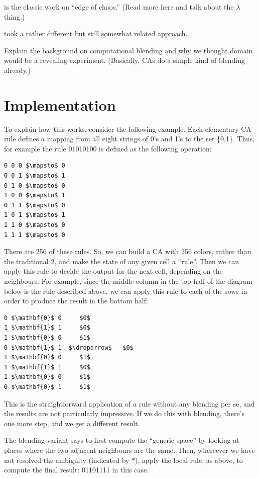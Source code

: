\documentclass{AISB2008}
\newcommand{\droparrow}{%
  \mathchoice{\raisebox{-4pt}{$\displaystyle\mapsto$}}
             {\raisebox{-4pt}{$\mapsto$}}
             {\raisebox{-2pt}{$\scriptstyle\mapsto$}}
             {\raisebox{-2pt}{$\scriptscriptstyle\mapsto$}}}
\begin{document}
\cite{mitchell1993revisiting} is the classic work on ``edge of
chaos.'' (Read more here and talk about the $\lambda$ thing.)

\cite{hofstadter1995prolegomena,marshall1999metacat} took a rather
different but still somewhat related approach.

Explain the background on computational blending and why we thought
domain would be a revealing experiment.  (Basically, CAs do a simple
kind of blending already.)

\clearpage

\section{Implementation}

To explain how this works, consider the following example.  Each elementary CA rule defines a mapping from all eight strings of 0's and 1's to the set \{0,1\}.  Thus, for example the rule 01010100 is defined as the following operation:
\begin{lstlisting}[mathescape]
0 0 0 $\mapsto$ 0
0 0 1 $\mapsto$ 1
0 1 0 $\mapsto$ 0
1 0 0 $\mapsto$ 1
0 1 1 $\mapsto$ 0
1 0 1 $\mapsto$ 1
1 1 0 $\mapsto$ 0
1 1 1 $\mapsto$ 0
\end{lstlisting}

There are 256 of these rules. So, we can build a CA with 256 colors, rather than the traditional 2, and make the state of any given cell a ``rule''. Then we can apply this rule to decide the output for the next cell, depending on the neighbours. For example, since the middle column in the top half of the diagram below is the rule described above, we can apply this rule to each of the rows in order to produce the result in the bottom half:
\begin{lstlisting}[mathescape]
0 $\mathbf{0}$ 0     $0$ 
1 $\mathbf{1}$ 1     $0$ 
1 $\mathbf{0}$ 0     $1$
0 $\mathbf{1}$ 1  $\droparrow$   $0$
1 $\mathbf{0}$ 0     $1$ 
1 $\mathbf{1}$ 1     $0$ 
1 $\mathbf{0}$ 0     $1$ 
0 $\mathbf{0}$ 1     $1$ 
\end{lstlisting}

This is the straightforward application of a rule without any blending per se, and the results are not particularly impressive.  If we do this with blending, there’s one more step, and we get a different result.

The blending variant says to first compute the ``generic space'' by looking at places where the two adjacent neighbours are the same. Then, whereever we have not resolved the ambiguity (indicated by $\ast$), apply the local rule, as above, to compute the final result: 01101111 in this case.
\end{document}
